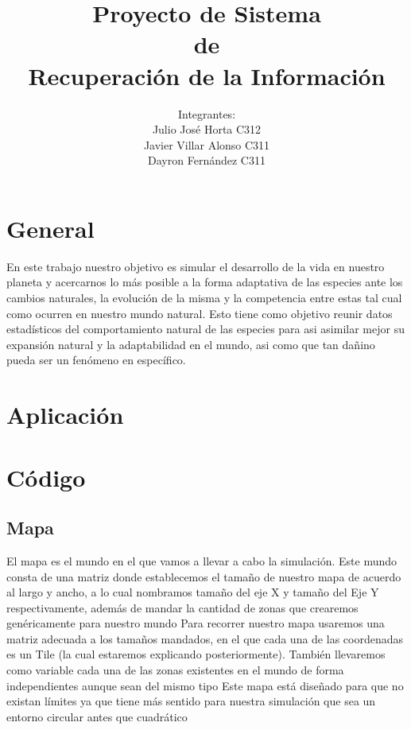 \documentclass{llncs}
\title{\large\huge Proyecto de Sistema \\de \\ Recuperación de la Información}
\author{Integrantes: \\ Julio José Horta C312 \\Javier Villar Alonso C311 \\ Dayron Fernández C311}
\begin{document}
	
\maketitle

\newpage

\section{General}
En este trabajo nuestro objetivo es simular el desarrollo de la vida en nuestro planeta y acercarnos lo más posible a la forma adaptativa de las especies ante los cambios naturales, la evolución de la misma y la competencia entre estas tal cual como ocurren en nuestro mundo natural.
\newline
\newline
Esto tiene como objetivo reunir datos estadísticos del comportamiento natural de las especies para asi asimilar mejor su expansión natural y la adaptabilidad en el mundo, asi como que tan dañino pueda ser un fenómeno en específico. 


\section{Aplicación}

\section{Código}

\subsection{Mapa}
El mapa es el mundo en el que vamos a llevar a cabo la simulación. Este mundo consta de una matriz donde establecemos el tamaño de nuestro mapa de acuerdo al largo y ancho, a lo cual nombramos tamaño del eje X y tamaño del Eje Y respectivamente, además de mandar la cantidad de zonas que crearemos genéricamente para nuestro mundo
\newline
\newline
Para recorrer nuestro mapa usaremos una matriz adecuada a los tamaños mandados, en el que cada una de las coordenadas es un Tile (la cual estaremos explicando posteriormente). También llevaremos como variable cada una de las zonas existentes en el mundo de forma independientes aunque sean del mismo tipo
\newline
\newline
Este mapa está diseñado para que no existan límites ya que tiene más sentido para nuestra simulación que sea un entorno circular antes que cuadrático
\end{document}
